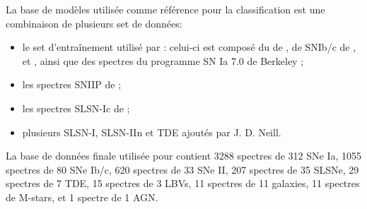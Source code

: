 \documentclass[../main/main.tex]{subfiles}
\begin{document}
La base de modèles utilisée comme référence pour la classification est
une combinaison de plusieurs set de données:
\begin{itemize}
  \item le set d'entraînement utilisé par 
    \citep{MuthukrishnaDash}: celui-ci est composé du 
    de , de SNIb/c de \citet{Liu2014SNIbc},
    \citet{Mojdaz2016} et \citet{Liu2016}, ainsi que des spectres du programme SN Ia 7.0
    de Berkeley \citep{Silverman2012};
  \item les spectres SNIIP de \citet{GutierrezSNII};
  \item les spectres SLSN-Ic de \citet{Liu2017SLSN};
  \item plusieurs SLSN-I, SLSN-IIn et TDE ajoutés par J. D. Neill.
\end{itemize}

La base de données finale utilisée pour  contient 3288
spectres de 312 SNe Ia, 1055 spectres de 80 SNe Ib/c, 620 spectres de 33
SNe II, 207 spectres de 35 SLSNe, 29 spectres de 7 TDE, 15 spectres de 3
LBVs, 11 spectres de 11 galaxies, 11 spectres de M-stars, et 1 spectre
de 1 AGN.
\end{document}
